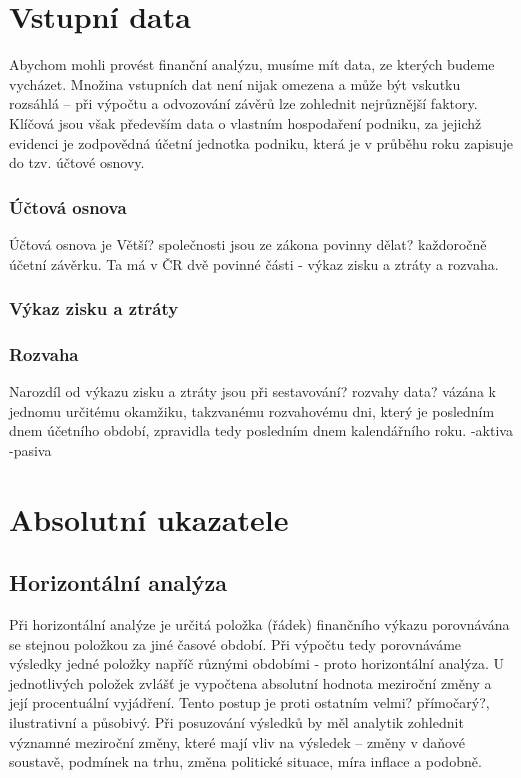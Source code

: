 \section{Vstupní data}
Abychom mohli provést finanční analýzu, musíme mít data, ze kterých budeme vycházet. Množina vstupních dat není nijak omezena a může být vskutku rozsáhlá -- při výpočtu a odvozování závěrů lze zohlednit nejrůznější faktory. Klíčová jsou však především data o vlastním hospodaření podniku, za jejichž evidenci je zodpovědná účetní jednotka podniku, která je v průběhu roku zapisuje do tzv. účtové osnovy.
\subsubsection{Účtová osnova}
Účtová osnova je 
Větší? společnosti jsou ze zákona povinny dělat? každoročně účetní závěrku. Ta má v ČR dvě povinné části - výkaz zisku a ztráty a rozvaha. 
\subsubsection{Výkaz zisku a ztráty}
\subsubsection{Rozvaha}
Narozdíl od výkazu zisku a ztráty jsou při sestavování? rozvahy data? vázána k jednomu určitému okamžiku, takzvanému rozvahovému dni, který je posledním dnem účetního období, zpravidla tedy posledním dnem kalendářního roku.
-aktiva
-pasiva

\section{Absolutní ukazatele}

\subsection{Horizontální analýza}
Při horizontální analýze je určitá položka (řádek) finančního výkazu porovnávána se stejnou položkou za jiné časové období. Při výpočtu tedy porovnáváme výsledky jedné položky napříč různými obdobími - proto horizontální analýza. U jednotlivých položek zvlášť je vypočtena absolutní hodnota meziroční změny a její procentuální vyjádření. Tento postup je proti ostatním velmi? přímočarý?, ilustrativní a působivý. Při posuzování výsledků by měl analytik zohlednit významné meziroční změny, které mají vliv na výsledek -- změny v daňové soustavě, podmínek na trhu, změna politické situace, míra inflace a podobně. 

